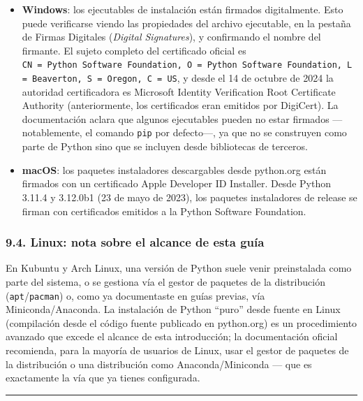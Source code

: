 \documentclass[
  doc,
  floatsintext,
  longtable,
  a4paper,
  nolmodern,
  notxfonts,
  notimes,
  12pt,
  colorlinks=true,linkcolor=blue,citecolor=blue,urlcolor=blue]{apa7}
\providecommand{\tightlist}{%
  \setlength{\itemsep}{0pt}\setlength{\parskip}{0pt}}
\begin{document}
\begin{itemize}
\tightlist
\item
  \textbf{Windows}: los ejecutables de instalación están firmados
  digitalmente. Esto puede verificarse viendo las propiedades del
  archivo ejecutable, en la pestaña de Firmas Digitales (\emph{Digital
  Signatures}), y confirmando el nombre del firmante. El sujeto completo
  del certificado oficial es
  \texttt{CN\ =\ Python\ Software\ Foundation,\ O\ =\ Python\ Software\ Foundation,\ L\ =\ Beaverton,\ S\ =\ Oregon,\ C\ =\ US},
  y desde el 14 de octubre de 2024 la autoridad certificadora es
  Microsoft Identity Verification Root Certificate Authority
  (anteriormente, los certificados eran emitidos por DigiCert). La
  documentación aclara que algunos ejecutables pueden no estar firmados
  ---notablemente, el comando \texttt{pip} por defecto---, ya que no se
  construyen como parte de Python sino que se incluyen desde bibliotecas
  de terceros.
\item
  \textbf{macOS}: los paquetes instaladores descargables desde
  python.org están firmados con un certificado Apple Developer ID
  Installer. Desde Python 3.11.4 y 3.12.0b1 (23 de mayo de 2023), los
  paquetes instaladores de release se firman con certificados emitidos a
  la Python Software Foundation.
\end{itemize}

\subsubsection{9.4. Linux: nota sobre el alcance de esta
guía}\label{linux-nota-sobre-el-alcance-de-esta-guuxeda}

En Kubuntu y Arch Linux, una versión de Python suele venir preinstalada
como parte del sistema, o se gestiona vía el gestor de paquetes de la
distribución (\texttt{apt}/\texttt{pacman}) o, como ya documentaste en
guías previas, vía Miniconda/Anaconda. La instalación de Python ``puro''
desde fuente en Linux (compilación desde el código fuente publicado en
python.org) es un procedimiento avanzado que excede el alcance de esta
introducción; la documentación oficial recomienda, para la mayoría de
usuarios de Linux, usar el gestor de paquetes de la distribución o una
distribución como Anaconda/Miniconda --- que es exactamente la vía que
ya tienes configurada.

\begin{center}\rule{0.5\linewidth}{0.5pt}\end{center}
\end{document}
